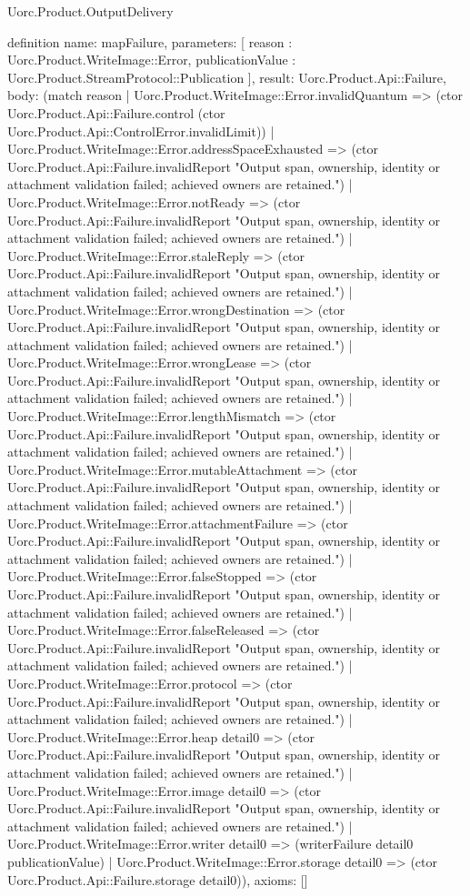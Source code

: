 \begin{lexlean}{Uorc.Product.OutputDelivery}
\begin{semanticmodule}
definition{
  name: mapFailure,
  parameters: [
    reason : Uorc.Product.WriteImage::Error,
    publicationValue : Uorc.Product.StreamProtocol::Publication
  ],
  result: Uorc.Product.Api::Failure,
  body: (match reason
    | Uorc.Product.WriteImage::Error.invalidQuantum => (ctor Uorc.Product.Api::Failure.control (ctor Uorc.Product.Api::ControlError.invalidLimit))
    | Uorc.Product.WriteImage::Error.addressSpaceExhausted => (ctor Uorc.Product.Api::Failure.invalidReport "Output span, ownership, identity or attachment validation failed; achieved owners are retained.")
    | Uorc.Product.WriteImage::Error.notReady => (ctor Uorc.Product.Api::Failure.invalidReport "Output span, ownership, identity or attachment validation failed; achieved owners are retained.")
    | Uorc.Product.WriteImage::Error.staleReply => (ctor Uorc.Product.Api::Failure.invalidReport "Output span, ownership, identity or attachment validation failed; achieved owners are retained.")
    | Uorc.Product.WriteImage::Error.wrongDestination => (ctor Uorc.Product.Api::Failure.invalidReport "Output span, ownership, identity or attachment validation failed; achieved owners are retained.")
    | Uorc.Product.WriteImage::Error.wrongLease => (ctor Uorc.Product.Api::Failure.invalidReport "Output span, ownership, identity or attachment validation failed; achieved owners are retained.")
    | Uorc.Product.WriteImage::Error.lengthMismatch => (ctor Uorc.Product.Api::Failure.invalidReport "Output span, ownership, identity or attachment validation failed; achieved owners are retained.")
    | Uorc.Product.WriteImage::Error.mutableAttachment => (ctor Uorc.Product.Api::Failure.invalidReport "Output span, ownership, identity or attachment validation failed; achieved owners are retained.")
    | Uorc.Product.WriteImage::Error.attachmentFailure => (ctor Uorc.Product.Api::Failure.invalidReport "Output span, ownership, identity or attachment validation failed; achieved owners are retained.")
    | Uorc.Product.WriteImage::Error.falseStopped => (ctor Uorc.Product.Api::Failure.invalidReport "Output span, ownership, identity or attachment validation failed; achieved owners are retained.")
    | Uorc.Product.WriteImage::Error.falseReleased => (ctor Uorc.Product.Api::Failure.invalidReport "Output span, ownership, identity or attachment validation failed; achieved owners are retained.")
    | Uorc.Product.WriteImage::Error.protocol => (ctor Uorc.Product.Api::Failure.invalidReport "Output span, ownership, identity or attachment validation failed; achieved owners are retained.")
    | Uorc.Product.WriteImage::Error.heap detail0 => (ctor Uorc.Product.Api::Failure.invalidReport "Output span, ownership, identity or attachment validation failed; achieved owners are retained.")
    | Uorc.Product.WriteImage::Error.image detail0 => (ctor Uorc.Product.Api::Failure.invalidReport "Output span, ownership, identity or attachment validation failed; achieved owners are retained.")
    | Uorc.Product.WriteImage::Error.writer detail0 => (writerFailure detail0 publicationValue)
    | Uorc.Product.WriteImage::Error.storage detail0 => (ctor Uorc.Product.Api::Failure.storage detail0)),
  axioms: []
}


\end{semanticmodule}
\end{lexlean}
